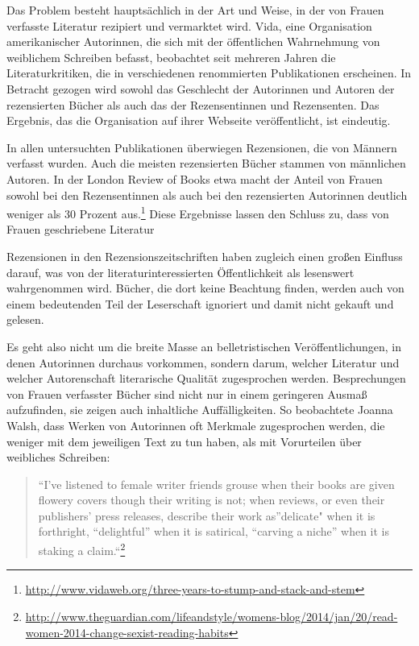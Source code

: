 \documentclass[a4paper,
fontsize=11pt,
oneside,
numbers=noperiodatend,
parskip=half-,
bibliography=totoc,
final
]{scrartcl}
\begin{document}
Das Problem besteht hauptsächlich in der Art und Weise, in der von
Frauen verfasste Literatur rezipiert und vermarktet wird. Vida, eine
Organisation amerikanischer Autorinnen, die sich mit der öffentlichen
Wahrnehmung von weiblichem Schreiben befasst, beobachtet seit mehreren
Jahren die Literaturkritiken, die in verschiedenen renommierten
Publikationen erscheinen. In Betracht gezogen wird sowohl das Geschlecht
der Autorinnen und Autoren der rezensierten Bücher als auch das der
Rezensentinnen und Rezensenten. Das Ergebnis, das die Organisation auf
ihrer Webseite veröffentlicht, ist eindeutig.~

In allen untersuchten Publikationen überwiegen Rezensionen, die von
Männern verfasst wurden. Auch die meisten rezensierten Bücher stammen
von männlichen Autoren. In der London Review of Books etwa macht der
Anteil von Frauen sowohl bei den Rezensentinnen als auch bei den
rezensierten Autorinnen deutlich weniger als 30 Prozent aus.\footnote{\url{http://www.vidaweb.org/three-years-to-stump-and-stack-and-stem}}
Diese Ergebnisse lassen den Schluss zu, dass von Frauen geschriebene
Literatur

Rezensionen in den Rezensionszeitschriften haben zugleich einen großen
Einfluss darauf, was von der literaturinteressierten Öffentlichkeit als
lesenswert wahrgenommen wird. Bücher, die dort keine Beachtung finden,
werden auch von einem bedeutenden Teil der Leserschaft ignoriert und
damit nicht gekauft und gelesen.~

Es geht also nicht um die breite Masse an belletristischen
Veröffentlichungen, in denen Autorinnen durchaus vorkommen, sondern
darum, welcher Literatur und welcher Autorenschaft literarische Qualität
zugesprochen werden. Besprechungen von Frauen verfasster Bücher sind
nicht nur in einem geringeren Ausmaß aufzufinden, sie zeigen auch
inhaltliche Auffälligkeiten. So beobachtete Joanna Walsh, dass Werken
von Autorinnen oft Merkmale zugesprochen werden, die weniger mit dem
jeweiligen Text zu tun haben, als mit Vorurteilen über weibliches
Schreiben:

\begin{quote}
\enquote{I've listened to female writer friends grouse when their books
are given flowery covers though their writing is not; when reviews, or
even their publishers' press releases, describe their work as}delicate"
when it is forthright, \enquote{delightful} when it is satirical,
\enquote{carving a niche} when it is staking a claim.``\footnote{\url{http://www.theguardian.com/lifeandstyle/womens-blog/2014/jan/20/read-women-2014-change-sexist-reading-habits}}
\end{quote}
\end{document}
